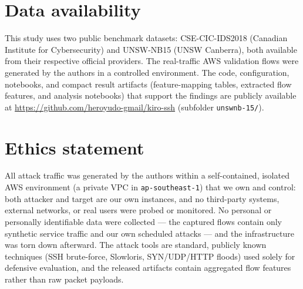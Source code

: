 \documentclass[preprint,12pt,authoryear]{elsarticle}
\begin{document}
\section*{Data availability}
This study uses two public benchmark datasets: CSE-CIC-IDS2018 (Canadian Institute
for Cybersecurity) and UNSW-NB15 (UNSW Canberra), both available from their
respective official providers. The real-traffic AWS validation flows were
generated by the authors in a controlled environment. The code, configuration,
notebooks, and compact result artifacts (feature-mapping tables, extracted flow
features, and analysis notebooks) that support the findings are publicly available
at \url{https://github.com/heroyudo-gmail/kiro-ssh} (subfolder \texttt{unswnb-15/}).

\section*{Ethics statement}
All attack traffic was generated by the authors within a self-contained, isolated
AWS environment (a private VPC in \texttt{ap-southeast-1}) that we own and control:
both attacker and target are our own instances, and no third-party systems,
external networks, or real users were probed or monitored. No personal or
personally identifiable data were collected --- the captured flows contain only
synthetic service traffic and our own scheduled attacks --- and the infrastructure
was torn down afterward. The attack tools are standard, publicly known techniques
(SSH brute-force, Slowloris, SYN/UDP/HTTP floods) used solely for defensive
evaluation, and the released artifacts contain aggregated flow features rather than
raw packet payloads.
\end{document}
